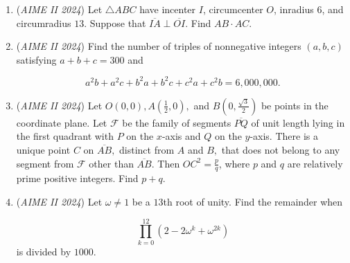 \begin{enumerate}
 
            \begin{itemize}
        \item each cell contains at most one chip
            \end{itemize}
            
            \begin{itemize}
        \item all chips in the same row and all chips in the same column have the same color, and
            \end{itemize}
            
            \begin{itemize}
        \item any additional chip placed on the grid would violate one or more of the previous two conditions.
            \end{itemize}
            

	\item (\textit{AIME II 2024}) Let $\triangle$$ABC$ have incenter $I$, circumcenter $O$, inradius $6$, and circumradius $13$. Suppose that $\overline{IA} \perp \overline{OI}$. Find $AB \cdot AC$.


 

	\item (\textit{AIME II 2024}) Find the number of triples of nonnegative integers $(a, b, c)$ satisfying $a + b + c = 300$ and 


 
 \[a^2 b + a^2 c + b^2 a + b^2 c + c^2 a + c^2 b = 6,000,000.\]


	\item (\textit{AIME II 2024}) Let $O(0,0),A(\frac{1}{2},0),$ and $B(0,\frac{\sqrt{3}}{2})$ be points in the coordinate plane. Let $\mathcal{F}$ be the family of segments $\overline{PQ}$ of unit length lying in the first quadrant with $P$ on the $x$-axis and $Q$ on the $y$-axis. There is a unique point $C$ on $\overline{AB},$ distinct from $A$ and $B,$ that does not belong to any segment from $\mathcal{F}$ other than $\overline{AB}$. Then $OC^2=\frac{p}{q}$, where $p$ and $q$ are relatively prime positive integers. Find $p+q$.


 

	\item (\textit{AIME II 2024}) Let $\omega\neq 1$ be a $13$th root of unity. Find the remainder when

 \[\prod_{k=0}^{12}(2-2\omega^k+\omega^{2k})\]
is divided by $1000$.



\end{enumerate}
